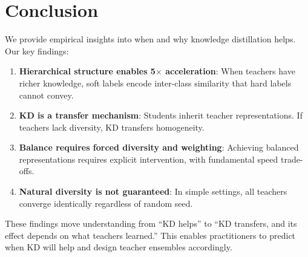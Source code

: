 \documentclass{article}
\begin{document}
\section{Conclusion}
\label{sec:conclusion}

We provide empirical insights into when and why knowledge distillation helps. Our key findings:

\begin{enumerate}
    \item \textbf{Hierarchical structure enables 5$\times$ acceleration}: When teachers have richer knowledge, soft labels encode inter-class similarity that hard labels cannot convey.

    \item \textbf{KD is a transfer mechanism}: Students inherit teacher representations. If teachers lack diversity, KD transfers homogeneity.

    \item \textbf{Balance requires forced diversity and weighting}: Achieving balanced representations requires explicit intervention, with fundamental speed trade-offs.

    \item \textbf{Natural diversity is not guaranteed}: In simple settings, all teachers converge identically regardless of random seed.
\end{enumerate}

These findings move understanding from ``KD helps'' to ``KD transfers, and its effect depends on what teachers learned.'' This enables practitioners to predict when KD will help and design teacher ensembles accordingly.


\end{document}
